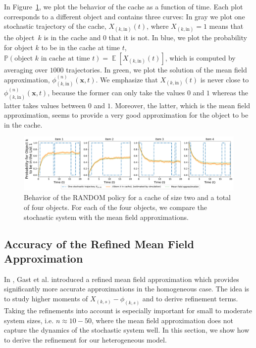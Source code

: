 \documentclass[acmsmall]{acmart}
\newcommand\bx{\mathbf{x}}
\newcommand\toN{^{(n)}}
\DeclareMathOperator{\E}{\mathbb{E}} %
\newcommand\Proba[1]{\mathbb{P}\left(#1\right)} %
\newcommand\esp[1]{\E\left[#1\right]} %
\begin{document}
In Figure~\ref{fig:cache_illustration}, we plot the behavior of the cache as a function of time. Each plot corresponds to a different object and contains three curves: In gray we plot one stochastic trajectory of the cache, $X_{(k,\text{in})}(t)$, where $X_{(k,\text{in})}=1$ means that the object~$k$ is in the cache and $0$ that it is not. In blue, we plot the probability for object $k$ to be in the cache at time $t$, $\Proba{\text{object $k$ in cache at time $t$}} = \esp{X_{(k,\text{in})}(t)}$, which is computed by averaging over $1000$ trajectories.  In green, we plot the solution of the mean field approximation, $\phi\toN_{(k,\text{in})}(\bx,t)$. We emphasize that $X_{(k,\text{in})}(t)$ is never close to $\phi\toN_{(k,\text{in})}(\bx,t)$, because the former can only take the values $0$ and $1$ whereas the latter takes values between $0$ and $1$. Moreover, the latter, which is the mean field approximation, seems to provide a very good approximation for the object to be in the cache. 
\begin{figure}[ht]
  \centering
  \includegraphics[width=\linewidth]{probability_cache_single}
  \caption{Behavior of the RANDOM policy for a cache of size two and a total of four objects. For each of the four objects, we compare the stochastic system with the mean field approximations.}
  \label{fig:cache_illustration}
\end{figure}


\subsection{Accuracy of the Refined Mean Field Approximation}
\label{ssec:rmf:definition}
\color{myorange}
In \cite{gastSizeExpansionsMean2019,gastRefinedMeanField2017}, Gast et al. introduced a refined mean field approximation which provides significantly more accurate approximations in the homogeneous case. The idea is to study higher moments of $X_{(k,s)} - \phi_{(k,s)}$ and to derive refinement terms. Taking the refinements into account is especially important for small to moderate system sizes, i.e. $n\approx10-50$, where the mean field approximation does not capture the dynamics of the stochastic system well. In this section, we show how to derive the refinement for our heterogeneous model.
\end{document}
